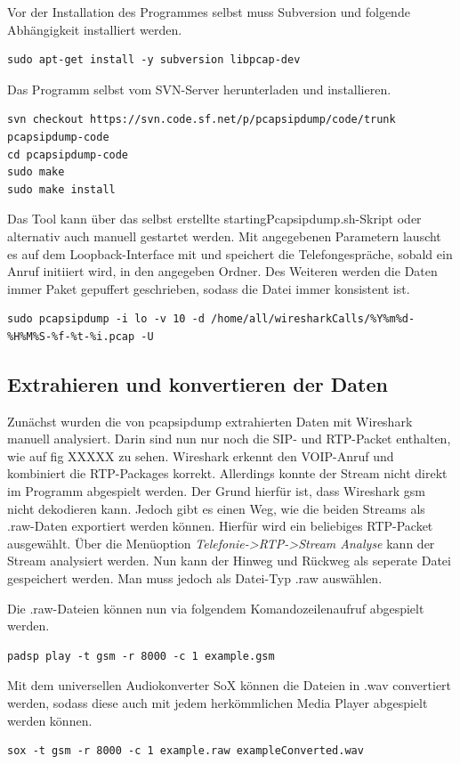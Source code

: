 Vor der Installation des Programmes selbst muss Subversion und folgende Abhängigkeit installiert werden.
\begin{lstlisting}
sudo apt-get install -y subversion libpcap-dev
\end{lstlisting}

Das Programm selbst vom SVN-Server herunterladen und installieren.
\begin{lstlisting}
svn checkout https://svn.code.sf.net/p/pcapsipdump/code/trunk pcapsipdump-code
cd pcapsipdump-code
sudo make
sudo make install
\end{lstlisting}

Das Tool kann über das selbst erstellte startingPcapsipdump.sh-Skript oder alternativ auch manuell gestartet werden. Mit angegebenen Parametern lauscht es auf dem Loopback-Interface mit und speichert die Telefongespräche, sobald ein Anruf initiiert wird, in den angegeben Ordner. Des Weiteren werden die Daten immer Paket gepuffert geschrieben, sodass die Datei immer konsistent ist.
\begin{lstlisting}
sudo pcapsipdump -i lo -v 10 -d /home/all/wiresharkCalls/%Y%m%d-%H%M%S-%f-%t-%i.pcap -U
\end{lstlisting}

\subsection{Extrahieren und konvertieren der Daten}\label{extractData}
Zunächst wurden die von pcapsipdump extrahierten Daten mit Wireshark manuell analysiert. Darin sind nun nur noch die SIP- und RTP-Packet enthalten, wie auf fig XXXXX zu sehen. Wireshark erkennt den VOIP-Anruf und kombiniert die RTP-Packages korrekt. Allerdings konnte der Stream nicht direkt im Programm abgespielt werden. Der Grund hierfür ist, dass Wireshark gsm nicht dekodieren kann.
Jedoch gibt es einen Weg, wie die beiden Streams als .raw-Daten exportiert werden können. Hierfür wird ein beliebiges RTP-Packet ausgewählt. Über die Menüoption \textit{Telefonie->RTP->Stream Analyse} kann der Stream analysiert werden. Nun kann der Hinweg und Rückweg als seperate Datei gespeichert werden. Man muss jedoch als Datei-Typ .raw auswählen.

Die .raw-Dateien können nun via folgendem Komandozeilenaufruf abgespielt werden.
\begin{lstlisting}
padsp play -t gsm -r 8000 -c 1 example.gsm
\end{lstlisting}

Mit dem universellen Audiokonverter SoX können die Dateien in .wav convertiert werden, sodass diese auch mit jedem herkömmlichen Media Player abgespielt werden können.
\begin{lstlisting}
sox -t gsm -r 8000 -c 1 example.raw exampleConverted.wav
\end{lstlisting}

